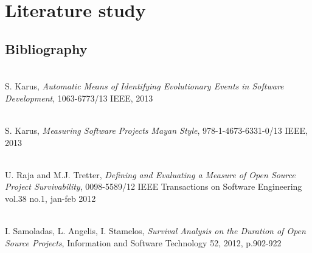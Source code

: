 \section{Literature study}

\subsection{Bibliography}
\begingroup
\renewcommand{\section}[2]{}%
\begin{thebibliography}{99}
	 \hfill \\ S. Karus, \emph{Automatic Means of
	Identifying Evolutionary Events in Software Development}, 1063-6773/13 IEEE,
	2013

	 \hfill \\ S. Karus, \emph{Measuring
	Software Projects Mayan Style}, 978-1-4673-6331-0/13 IEEE, 2013

	 \hfill \\ U. Raja and M.J.
	Tretter, \emph{Defining and Evaluating a Measure of Open Source Project Survivability},
	0098-5589/12 IEEE Transactions on Software Engineering vol.38 no.1, jan-feb
	2012

	 \hfill \\ I. Samoladas, L. Angelis, I.
	Stamelos, \emph{Survival Analysis on the Duration of Open Source Projects},
	Information and Software Technology 52, 2012, p.902-922
\end{thebibliography}
\endgroup

